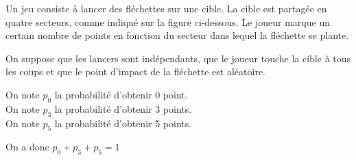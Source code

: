 \documentclass[oneside,12pt]{article}
\begin{document}
\begin{minipage}{0.6\linewidth} \restoreskip
	Un jeu consiste à lancer des fléchettes sur une cible. La cible est partagée en quatre secteurs, comme 	indiqué sur la figure ci-dessous. Le joueur marque un certain nombre de points en fonction du secteur dans 	lequel la fléchette se plante.

	On suppose que les lancers sont indépendants, que le joueur touche la cible à tous les coups et que le point d'impact de la fléchette est aléatoire.
	
	On note $p_0$ la probabilité d’obtenir 0 point.\\
	On note $p_3$ la probabilité d’obtenir 3 points.\\
	On note $p_5$ la probabilité d’obtenir 5 points.
	
	On a donc $p_0 + p_3 + p_5 = 1$
\end{minipage} \hspace{5mm}
\begin{minipage}{0.6\linewidth}
\end{minipage}
\end{document}
